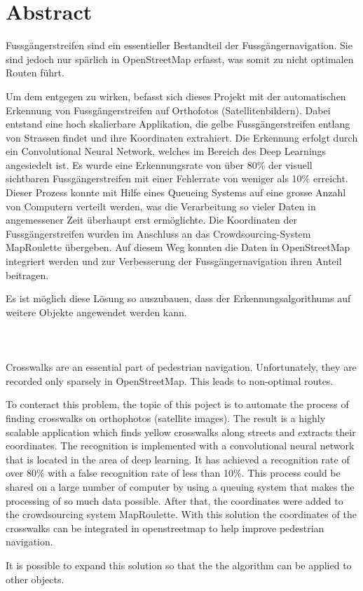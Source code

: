 \section{Abstract}

Fussgängerstreifen sind ein essentieller Bestandteil der Fussgängernavigation. Sie sind jedoch nur spärlich in OpenStreetMap erfasst, was somit zu nicht optimalen Routen führt.

Um dem entgegen zu wirken,  befasst sich dieses Projekt mit der automatischen Erkennung von Fussgängerstreifen auf Orthofotos (Satellitenbildern). 
Dabei entstand eine hoch skalierbare Applikation, die gelbe Fussgängerstreifen entlang von Strassen findet und ihre Koordinaten extrahiert. Die Erkennung erfolgt durch ein Convolutional Neural Network, welches im Bereich des Deep Learnings angesiedelt ist.
Es wurde eine Erkennungsrate von über 80\% der visuell sichtbaren Fussgängerstreifen mit einer Fehlerrate von weniger als 10\% erreicht. Dieser Prozess konnte mit Hilfe eines Queueing Systems auf eine grosse Anzahl von Computern verteilt werden, was die Verarbeitung so vieler Daten in angemessener Zeit überhaupt erst ermöglichte. Die Koordinaten der Fussgängerstreifen wurden im Anschluss an das Crowdsourcing-System MapRoulette übergeben. Auf diesem Weg konnten die Daten in OpenStreetMap integriert werden und zur Verbesserung der Fussgängernavigation ihren Anteil beitragen.

Es ist möglich diese Lösung so auszubauen, dass der Erkennungsalgorithums auf weitere Objekte angewendet werden kann.\\ \\ \\ \\




Crosswalks are an essential part of pedestrian navigation. Unfortunately, they are recorded only sparsely in OpenStreetMap. This leads to non-optimal routes.

To conteract this problem, the topic of this poject is to automate the process of finding crosswalks on orthophotos (satellite images). The result is a highly scalable application which finds yellow crosswalks along streets and extracts their coordinates. The recognition is implemented with a convolutional neural network that is located in the area of deep learning. It has achieved a recognition rate of over 80\% with a false recognition rate of less than 10\%. This process could be shared on a large number of computer by using a queuing system that makes the processing of so much data possible. After that, the coordinates were added to the crowdsourcing system MapRoulette. With this solution the coordinates of the crosswalks can be integrated in openstreetmap to help improve pedestrian navigation.

It is possible to expand this solution so that the the algorithm can be applied to other objects.

